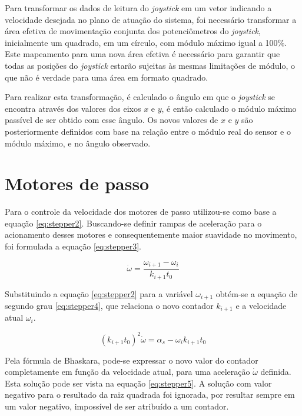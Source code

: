 Para transformar os dados de leitura do \textit{joystick} em um vetor indicando
a velocidade desejada no plano de atuação do sistema, foi necessário transformar
a área efetiva de movimentação conjunta dos potenciômetros do \textit{joystick},
inicialmente um quadrado, em um círculo, com módulo máximo igual a 100\%.
Este mapeamento para uma nova área efetiva é necessário para 
garantir que todas as posições do \textit{joystick} estarão sujeitas às mesmas 
limitações de módulo, o que não é verdade para uma área em formato quadrado.

Para realizar esta transformação, é calculado o ângulo em que o \textit{joystick}
se encontra através dos valores dos eixos $x$ e $y$, é então calculado o módulo máximo 
passível de ser obtido com esse ângulo. Os novos valores de $x$ e $y$ são posteriormente
definidos com base na relação entre o módulo real do sensor e o módulo máximo, e no 
ângulo observado.

\section{Motores de passo}

Para o controle da velocidade dos motores de passo utilizou-se como base a equação
\ref{eq:stepper2}. Buscando-se definir rampas de aceleração para o acionamento
desses motores e consequentemente maior suavidade no movimento, foi formulada a equação 
\ref{eq:stepper3}.

\begin{equation}
    \label{eq:stepper3}
    \dot{\omega} = \frac{\omega_{i+1}-\omega_i}{k_{i+1}t_0}
\end{equation}

Substituindo a equação \ref{eq:stepper2} para a variável $\omega_{i+1}$
obtém-se a equação de segundo grau \ref{eq:stepper4}, que relaciona o novo 
contador $k_{i+1}$ e a velocidade atual $\omega_i$.

\begin{equation}
    \label{eq:stepper4}
    (k_{i+1}t_0)^2\dot{\omega} = \alpha_s - \omega_ik_{i+1}t_0
\end{equation}

Pela fórmula de Bhaskara, pode-se expressar o novo valor do contador completamente
em função da velocidade atual, para uma aceleração $\dot{\omega}$ definida. Esta 
solução pode ser vista na equação \ref{eq:stepper5}. A solução com valor negativo
para o resultado da raiz quadrada foi ignorada, por resultar sempre em um valor negativo,
impossível de ser atribuído a um contador.

